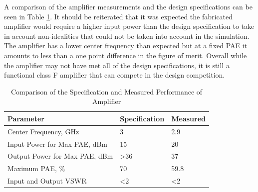  A comparison of the amplifier measurements and the design specifications can be seen in Table \ref{table:meas_spec_compare}. It should be reiterated that it was expected the fabricated amplifier would require a higher input power than the design specification to take in account non-idealities that could not be taken into account in the simulation. The amplifier has a lower center frequency than expected but at a fixed PAE it amounts to less than a one point difference in the figure of merit. Overall while the amplifier may not have met all of the design specifications, it is still a functional class F amplifier that can compete in the design competition.

\begin{table}
    \centering
    \caption{Comparison of the Specification and Measured Performance of Amplifier}
    \label{table:meas_spec_compare}
    \begin{tabular}{|l|l|l|}
      \hline
      {Parameter}                      & {Specification }   & {Measured} \\ \hline
      {Center Frequency, GHz}          & 3                  & 2.9 \\ \hline
      {Input Power for Max PAE, dBm}    & 15                 & 20 \\ \hline
      {Output Power for Max PAE, dBm}  & {\textgreater 36}  & {37} \\ \hline
      {Maximum PAE, \%}                & 70                 & {59.8} \\ \hline
      {Input and Output VSWR}          & {\textless 2}      & {\textless 2} \\ \hline
    \end{tabular}
\end{table}

